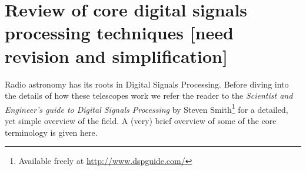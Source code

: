 % 
%  
 \section{Review of core digital signals processing techniques [need revision and simplification]}
Radio astronomy has its roots in Digital Signals Processing. Before diving into the details of how these telescopes work we refer the reader to the \textit{Scientist and Engineer's guide to Digital Signals Processing} by 
Steven Smith\footnote{Available freely at \url{http://www.dspguide.com/}}\cite{smith1997scientist} for a detailed, yet simple overview of the field. A (very) brief overview of some of the core terminology is given here.


